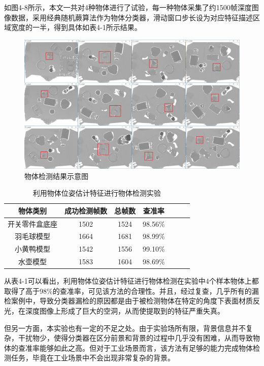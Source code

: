 如图4-8所示，本文一共对4种物体进行了试验，每一种物体采集了约1500帧深度图像数据，采用经典随机蕨算法作为物体分类器，滑动窗口步长设为对应特征描述区域宽度的一半，得到具体如表4-1所示结果。
\begin{figure}[htb]
	\centering 
	\includegraphics[width=\textwidth]{./mypic/物体检测结果图.jpg} 
	\caption{物体检测结果示意图} 
\end{figure}

\begin{table}[htb]
	\caption{利用物体位姿估计特征进行物体检测实验} 
	\centering 
	\begin{tabular}[t]{
		ccccccc} 
		\toprule
		物体类别 & 成功检测帧数 & 总帧数 & 查准率\\ 
		\midrule
		开关零件盒底座 & 1502 & 1524 & 98.56\% \\
		羽毛球模型 & 1664 & 1681 & 98.99\% \\
		小黄鸭模型 & 1542 & 1556 & 99.10\% \\
		水壶模型 & 1583 & 1604 & 98.69\% \\
		\bottomrule
	\end{tabular}
\end{table}



从表4-1可以看出，利用物体位姿估计特征进行物体检测在实验中4个样本物体上都取得了高于98\%的查准率，可见该方法的合理性。并且，经过复查，几乎所有的漏检案例中，导致分类器漏检的原因都是由于被检测物体在特定的角度下表面材质反光，在深度图像上形成了巨大的空洞，从而使提取到的特征严重失真。

但另一方面，本实验也有一定的不足之处。由于实验场所有限，背景信息并不复杂，干扰物少，使得分类器在区分前景和背景的过程中几乎没有困难，从而导致物体的查准率能够如此之高。但对于工业场景而言，该方法有足够的能力完成物体检测任务，毕竟在工业场景中不会出现非常复杂的背景。

